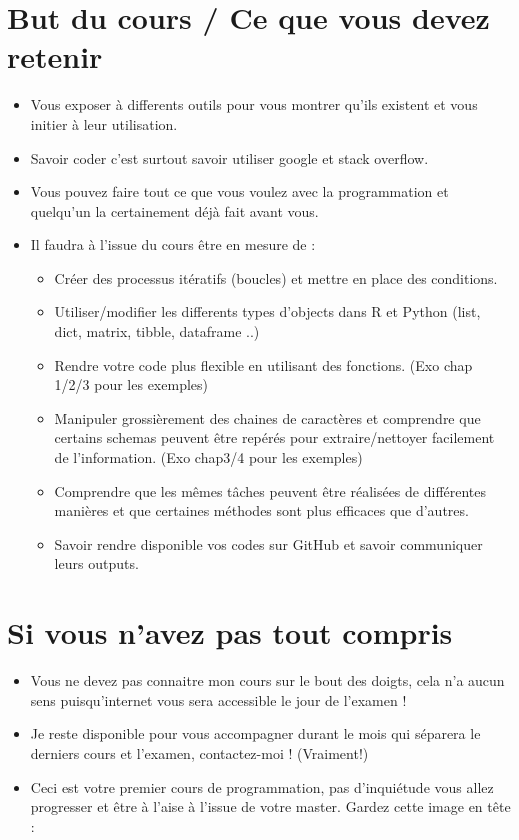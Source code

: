 \documentclass[
]{article}
\providecommand{\tightlist}{%
  \setlength{\itemsep}{0pt}\setlength{\parskip}{0pt}}
\begin{document}
\hypertarget{but-du-cours-ce-que-vous-devez-retenir}{%
\section{But du cours / Ce que vous devez
retenir}\label{but-du-cours-ce-que-vous-devez-retenir}}

\begin{itemize}
\item
  Vous exposer à differents outils pour vous montrer qu'ils existent et
  vous initier à leur utilisation.
\item
  Savoir coder c'est surtout savoir utiliser google et stack overflow.
\item
  Vous pouvez faire tout ce que vous voulez avec la programmation et
  quelqu'un la certainement déjà fait avant vous.
\item
  Il faudra à l'issue du cours être en mesure de :

  \begin{itemize}
  \tightlist
  \item
    Créer des processus itératifs (boucles) et mettre en place des
    conditions.
  \item
    Utiliser/modifier les differents types d'objects dans R et Python
    (list, dict, matrix, tibble, dataframe ..)
  \item
    Rendre votre code plus flexible en utilisant des fonctions. (Exo
    chap 1/2/3 pour les exemples)
  \item
    Manipuler grossièrement des chaines de caractères et comprendre que
    certains schemas peuvent être repérés pour extraire/nettoyer
    facilement de l'information. (Exo chap3/4 pour les exemples)
  \item
    Comprendre que les mêmes tâches peuvent être réalisées de
    différentes manières et que certaines méthodes sont plus efficaces
    que d'autres.
  \item
    Savoir rendre disponible vos codes sur GitHub et savoir communiquer
    leurs outputs.
  \end{itemize}
\end{itemize}

\hypertarget{si-vous-navez-pas-tout-compris}{%
\section{Si vous n'avez pas tout
compris}\label{si-vous-navez-pas-tout-compris}}

\begin{itemize}
\item
  Vous ne devez pas connaitre mon cours sur le bout des doigts, cela n'a
  aucun sens puisqu'internet vous sera accessible le jour de l'examen !
\item
  Je reste disponible pour vous accompagner durant le mois qui séparera
  le derniers cours et l'examen, contactez-moi ! (Vraiment!)
\item
  Ceci est votre premier cours de programmation, pas d'inquiétude vous
  allez progresser et être à l'aise à l'issue de votre master. Gardez
  cette image en tête :
\end{itemize}
\end{document}

